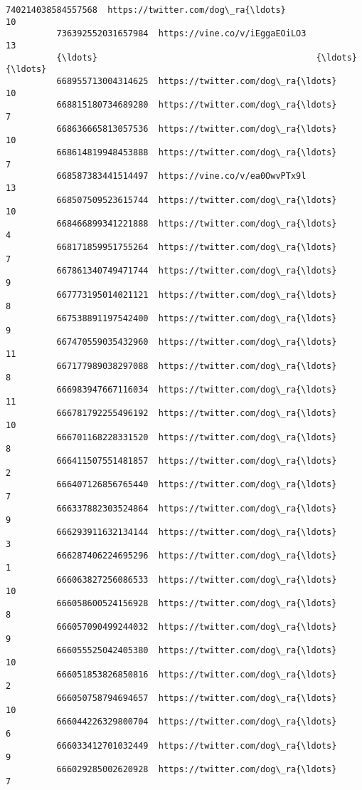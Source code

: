 \documentclass[11pt]{article}
\begin{document}
\begin{Verbatim}[commandchars=\\\{\}]
          740214038584557568  https://twitter.com/dog\_ra{\ldots}                10   
          736392552031657984  https://vine.co/v/iEggaEOiLO3                13   
          {\ldots}                                           {\ldots}               {\ldots}   
          668955713004314625  https://twitter.com/dog\_ra{\ldots}                10   
          668815180734689280  https://twitter.com/dog\_ra{\ldots}                 7   
          668636665813057536  https://twitter.com/dog\_ra{\ldots}                10   
          668614819948453888  https://twitter.com/dog\_ra{\ldots}                 7   
          668587383441514497  https://vine.co/v/ea0OwvPTx9l                13   
          668507509523615744  https://twitter.com/dog\_ra{\ldots}                10   
          668466899341221888  https://twitter.com/dog\_ra{\ldots}                 4   
          668171859951755264  https://twitter.com/dog\_ra{\ldots}                 7   
          667861340749471744  https://twitter.com/dog\_ra{\ldots}                 9   
          667773195014021121  https://twitter.com/dog\_ra{\ldots}                 8   
          667538891197542400  https://twitter.com/dog\_ra{\ldots}                 9   
          667470559035432960  https://twitter.com/dog\_ra{\ldots}                11   
          667177989038297088  https://twitter.com/dog\_ra{\ldots}                 8   
          666983947667116034  https://twitter.com/dog\_ra{\ldots}                11   
          666781792255496192  https://twitter.com/dog\_ra{\ldots}                10   
          666701168228331520  https://twitter.com/dog\_ra{\ldots}                 8   
          666411507551481857  https://twitter.com/dog\_ra{\ldots}                 2   
          666407126856765440  https://twitter.com/dog\_ra{\ldots}                 7   
          666337882303524864  https://twitter.com/dog\_ra{\ldots}                 9   
          666293911632134144  https://twitter.com/dog\_ra{\ldots}                 3   
          666287406224695296  https://twitter.com/dog\_ra{\ldots}                 1   
          666063827256086533  https://twitter.com/dog\_ra{\ldots}                10   
          666058600524156928  https://twitter.com/dog\_ra{\ldots}                 8   
          666057090499244032  https://twitter.com/dog\_ra{\ldots}                 9   
          666055525042405380  https://twitter.com/dog\_ra{\ldots}                10   
          666051853826850816  https://twitter.com/dog\_ra{\ldots}                 2   
          666050758794694657  https://twitter.com/dog\_ra{\ldots}                10   
          666044226329800704  https://twitter.com/dog\_ra{\ldots}                 6   
          666033412701032449  https://twitter.com/dog\_ra{\ldots}                 9   
          666029285002620928  https://twitter.com/dog\_ra{\ldots}                 7   
          

\end{Verbatim}
\end{document}
